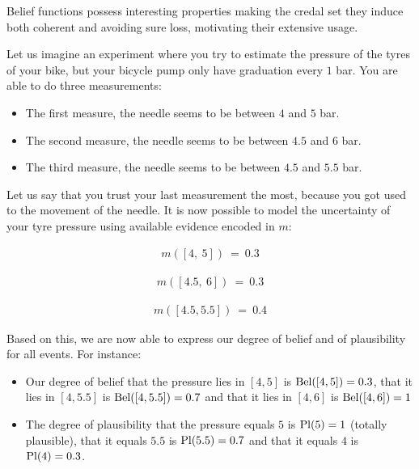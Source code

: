 Belief functions possess interesting properties making the credal set they induce both coherent and avoiding sure loss, motivating their extensive usage.

\begin{example}\label{ex:bicycle_pressure}
    Let us imagine an experiment where you try to estimate the pressure of the tyres of your bike, but your bicycle pump only have graduation every $1$ bar. You are able to do three measurements:
    \begin{itemize}
        \item The first measure, the needle seems to be between $4$ and $5$ bar.
        \item The second measure, the needle seems to be between $4.5$ and $6$ bar.
        \item The third measure, the needle seems to be between $4.5$ and $5.5$ bar.
    \end{itemize}
    Let us say that you trust your last measurement the most, because you got used to the movement of the needle. It is now possible to model the uncertainty of your tyre pressure using available evidence encoded in $m$:\\
    \noindent
    \begin{minipage}{0.3\textwidth}
        \begin{align*}
            m([4,~5]) ~=~ 0.3
        \end{align*}
    \end{minipage}\hfill
    \begin{minipage}{0.3\textwidth}
        \begin{align*}
            m([4.5,~6]) ~=~ 0.3
        \end{align*}
    \end{minipage}\hfill
    \begin{minipage}{0.3\textwidth}
        \begin{align*}
             m([4.5,5.5]) ~=~ 0.4
        \end{align*}
    \end{minipage}\par
    Based on this, we are now able to express our degree of belief and of plausibility for all events. For instance:
    \begin{itemize}
        \item Our degree of belief that the pressure lies in $[4, 5]$ is $\mathrm{Bel}([4, 5])=0.3$, that it lies in $[4, 5.5]$ is $\mathrm{Bel}([4, 5.5])=0.7$ and that it lies in $[4, 6]$ is $\mathrm{Bel}([4, 6])=1$
        \item The degree of plausibility that the pressure equals $5$ is $\mathrm{Pl} (5)=1$ (totally plausible), that it equals $5.5$ is $\mathrm{Pl} (5.5)=0.7$ and that it equals $4$ is $\mathrm{Pl} (4)=0.3$.
    \end{itemize}
\end{example}

